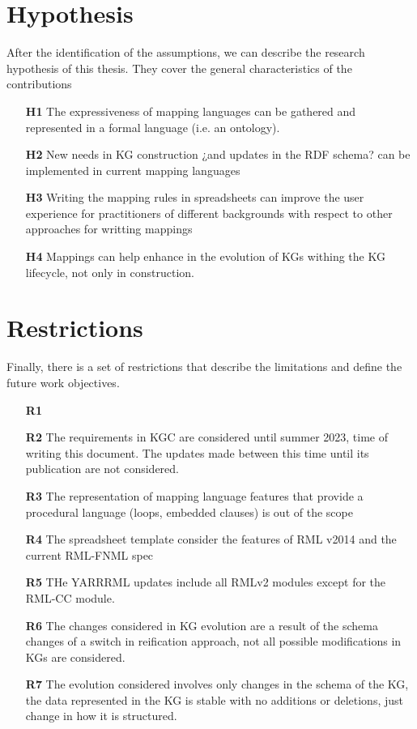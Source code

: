 \section{Hypothesis}
\label{sec:chp3-hypothesis}

After the identification of the assumptions, we can describe the research hypothesis  of this thesis. They cover the general characteristics of the contributions 

\begin{enumerate}
    \item[\textbf{H1}] The expressiveness of mapping languages can be gathered and represented in a formal language (i.e. an ontology).
    \item[\textbf{H2}] New needs in KG construction ¿and updates in the RDF schema?  can be implemented in current mapping languages
    \item[\textbf{H3}] Writing the mapping rules in spreadsheets can improve the user experience for practitioners of different backgrounds with respect to other approaches for writting mappings
    \item[\textbf{H4}] Mappings can help enhance in the evolution of KGs withing the KG lifecycle, not only in construction.
\end{enumerate}


\section{Restrictions}
\label{sec:chp3-restrictions}

Finally, there is a set of restrictions that describe the limitations and define the future work objectives.

\begin{enumerate}
    \item[\textbf{R1}] 
    \item[\textbf{R2}] The requirements in KGC are considered until summer 2023, time of writing this document. The updates made between this time until its publication are not considered.
    \item[\textbf{R3}] The representation of mapping language features that provide a procedural language (loops, embedded clauses) is out of the scope
    \item[\textbf{R4}] The spreadsheet template consider the features of RML v2014 and the current RML-FNML spec
    \item[\textbf{R5}] THe YARRRML updates include all RMLv2 modules except for the RML-CC module.
    \item[\textbf{R6}] The changes considered in KG evolution are a result of the schema changes of a switch in reification approach, not all possible modifications in KGs are considered.
    \item[\textbf{R7}] The evolution considered involves only changes in the schema of the KG, the data represented in the KG is stable with no additions or deletions, just change in how it is structured.
\end{enumerate}
